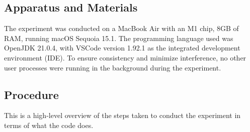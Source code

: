 \documentclass[unicode,11pt,a4paper,oneside,numbers=endperiod,openany]{scrartcl}
\begin{document}
    \newpage 

    \subsection{Apparatus and Materials}

    The experiment was conducted on a MacBook Air with an M1 chip, 8GB of RAM, running macOS Sequoia 15.1. The programming language used was OpenJDK 21.0.4, with VSCode version 1.92.1 as the integrated development environment (IDE). To ensure consistency and minimize interference, no other user processes were running in the background during the experiment.

    \subsection{Procedure}

    This is a high-level overview of the steps taken to conduct the experiment in terms of what the code does. \\
\end{document}
